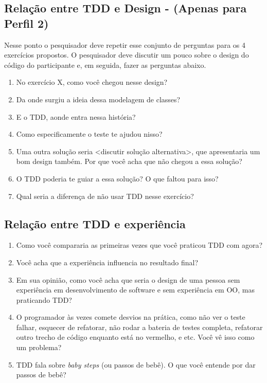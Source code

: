 \subsection{Relação entre TDD e Design - (Apenas para Perfil 2)}

Nesse ponto o pesquisador deve repetir esse conjunto de perguntas
para os 4 exercícios propostos.
O pesquisador deve discutir um pouco sobre o design do código do participante e, em seguida,
fazer as perguntas abaixo.

\begin{enumerate}
	
	\item No exercício X, como você chegou nesse design?
	
	\item Da onde surgiu a ideia dessa modelagem de classes?
	
	\item E o TDD, aonde entra nessa história?
	
	\item Como especificamente o teste te ajudou nisso?
	
	\item Uma outra solução seria <discutir solução alternativa>, que apresentaria um bom design também. Por que você
	acha que não chegou a essa solução?
	
	\item O TDD poderia te guiar a essa solução? O que faltou para isso?
	
	\item Qual seria a diferença de não usar TDD nesse exercício?

\end{enumerate}


\subsection{Relação entre TDD e experiência}

\begin{enumerate}
	\item Como você compararia as primeiras vezes que você praticou TDD com agora?

	\item Você acha que a experiência influencia no resultado final?

	\item Em sua opinião, como você acha que seria o design de uma pessoa sem
	experiência em desenvolvimento de software e sem experiência em OO, mas praticando TDD?

	\item O programador às vezes comete desvios na prática, como não ver o teste
	falhar,  esquecer de refatorar, não rodar a bateria de testes completa,
	refatorar outro trecho de código enquanto está no vermelho, e etc. Você vê isso
	como um problema?
	
	\item TDD fala sobre \textit{baby steps} (ou passos de bebê). O que você 
	entende por dar passos de bebê?

\end{enumerate}

